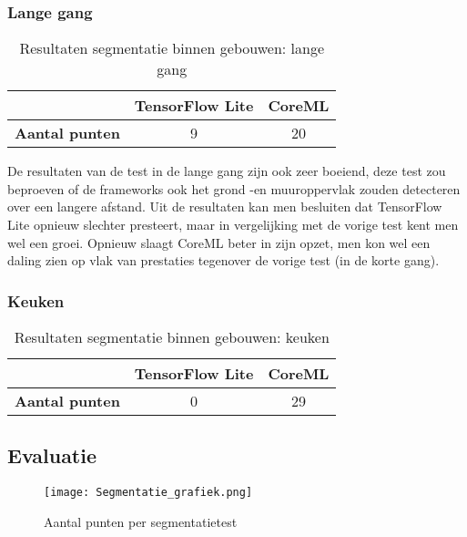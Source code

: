 \subsubsection{Lange gang}
\begin{table}[H]
	\centering
	\begin{tabular}{|c|c|c|}
		\hline
		& \textbf{TensorFlow Lite} & \textbf{CoreML} \\ \hline
		\textbf{Aantal punten} & 9                        & 20              \\ \hline
	\end{tabular}
	\caption{Resultaten segmentatie binnen gebouwen: lange gang}
\end{table}
De resultaten van de test in de lange gang zijn ook zeer boeiend, deze test zou beproeven of de frameworks ook het grond -en muuroppervlak zouden detecteren over een langere afstand. Uit de resultaten kan men besluiten dat TensorFlow Lite opnieuw slechter presteert, maar in vergelijking met de vorige test kent men wel een groei. Opnieuw slaagt CoreML beter in zijn opzet, men kon wel een daling zien op vlak van prestaties tegenover de vorige test (in de korte gang).
\subsubsection{Keuken}

\begin{table}[H]
	\centering
	\begin{tabular}{|c|c|c|}
		\hline
		& \textbf{TensorFlow Lite} & \textbf{CoreML} \\ \hline
		\textbf{Aantal punten} & 0                        & 29              \\ \hline
	\end{tabular}
	\caption{Resultaten segmentatie binnen gebouwen: keuken}
\end{table}

\subsection{Evaluatie}
\begin{figure}[H]
	\centering
	\texttt{[image: Segmentatie\_grafiek.png]}
	\caption{Aantal punten per segmentatietest}
\end{figure}



